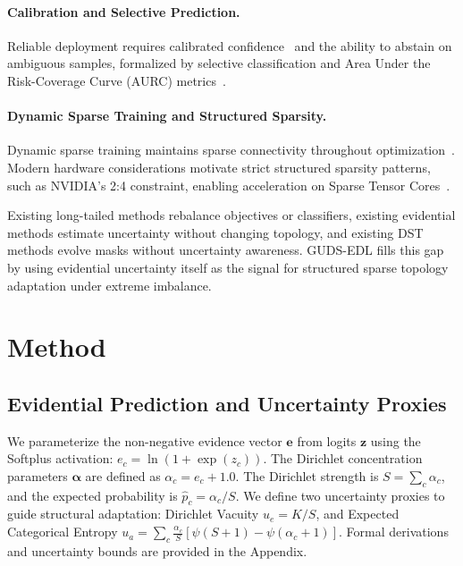 \documentclass[letterpaper]{article} %
\begin{document}
\paragraph{Calibration and Selective Prediction.} Reliable deployment requires calibrated confidence~\cite{guo2017calibration} and the ability to abstain on ambiguous samples, formalized by selective classification and Area Under the Risk-Coverage Curve (AURC) metrics~\cite{geifman2017selective,geifman2019selectivenet,ding2020revisiting}.

\paragraph{Dynamic Sparse Training and Structured Sparsity.} Dynamic sparse training maintains sparse connectivity throughout optimization~\cite{dettmers2019sparse,evci2020rigging}. Modern hardware considerations motivate strict structured sparsity patterns, such as NVIDIA's 2:4 constraint, enabling acceleration on Sparse Tensor Cores~\cite{mishra2021accelerating,lasby2023srigl}.

Existing long-tailed methods rebalance objectives or classifiers, existing evidential methods estimate uncertainty without changing topology, and existing DST methods evolve masks without uncertainty awareness. GUDS-EDL fills this gap by using evidential uncertainty itself as the signal for structured sparse topology adaptation under extreme imbalance.

\section{Method}

\subsection{Evidential Prediction and Uncertainty Proxies}
We parameterize the non-negative evidence vector $\bm{e}$ from logits $\bm{z}$ using the Softplus activation: $e_c = \ln(1 + \exp(z_c))$. The Dirichlet concentration parameters $\bm{\alpha}$ are defined as $\alpha_c = e_c + 1.0$. The Dirichlet strength is $S = \sum_c \alpha_c$, and the expected probability is $\hat{p}_c = \alpha_c / S$. We define two uncertainty proxies to guide structural adaptation: Dirichlet Vacuity $u_e = K / S$, and Expected Categorical Entropy $u_a = \sum_c \frac{\alpha_c}{S}[\psi(S+1) - \psi(\alpha_c+1)]$. Formal derivations and uncertainty bounds are provided in the Appendix.
\end{document}

